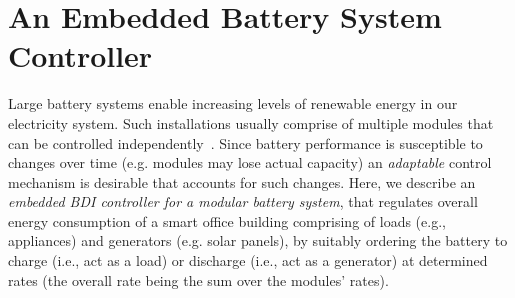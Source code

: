 \section{An Embedded Battery System Controller}\label{sec:application}

\newcommand{\aSet}{\mathname{set}}
\newcommand{\aOperate}{\mathname{operate}}
\newcommand{\aEvaluate}{\mathname{evaluate}}

\newcommand{\pSet}{\mathname{Set*}}
\newcommand{\pSetCharge}{\mathname{SetCharge}}
\newcommand{\pSetDischarge}{\mathname{SetDischarge}}
\newcommand{\pSetNotUsed}{\mathname{SetNotUsed}}
\newcommand{\pExecute}{\mathname{Execute}}

\newcommand{\cSatisfies}{\psi}



Large battery systems enable increasing levels of renewable energy in our electricity system. 
%
Such installations usually comprise of multiple modules that can be controlled independently~\cite{norris02:grid}. 
Since battery performance is susceptible to changes over time (e.g. modules may lose actual capacity) an \emph{adaptable} control mechanism is desirable that accounts for such changes.
%
Here, we describe an {\em embedded BDI controller for a modular battery system}, that regulates overall energy consumption of a smart office building comprising of loads (e.g., appliances) and generators (e.g. solar panels), by suitably ordering the battery to charge (i.e., act as a load) or discharge (i.e., act as a generator) at determined rates (the overall rate being the sum over the modules' rates).

